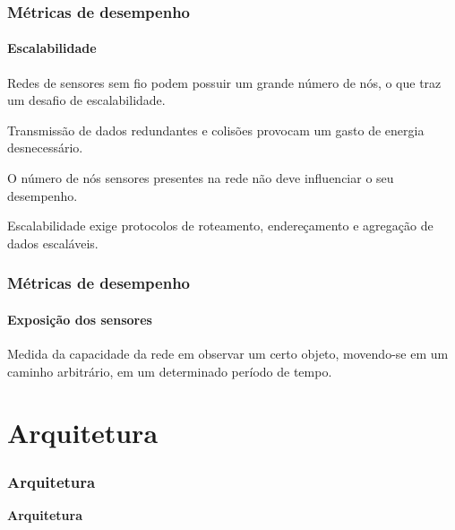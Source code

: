 \documentclass[notes]{beamer}
\begin{document}
\begin{frame}
\frametitle{Métricas de desempenho}
\framesubtitle{Escalabilidade}

\begin{block}

Redes de sensores sem fio podem possuir um grande número de nós, o que traz um desafio de escalabilidade. 
\end{block} \pause

\begin{alertblock}

Transmissão de dados redundantes e colisões provocam um gasto de energia desnecessário.  
\end{alertblock} \pause

\begin{alertblock}

O número de nós sensores presentes na rede não deve influenciar o seu desempenho. 
\end{alertblock} \pause

\begin{block}

Escalabilidade exige protocolos de roteamento, endereçamento e agregação de dados escaláveis.

\end{block}

\end{frame}

\begin{frame}
\frametitle{Métricas de desempenho}
\framesubtitle{Exposição dos sensores}

\begin{block}

Medida da capacidade da rede em observar um certo objeto, movendo-se em um caminho arbitrário, em um determinado período de tempo.
 
\end{block} 

\end{frame}

\section{Arquitetura}
\begin{frame}
\frametitle{Arquitetura}

\begin{block}

 \center \textbf{Arquitetura}
 
\end{block}

\end{frame}
\end{document}
